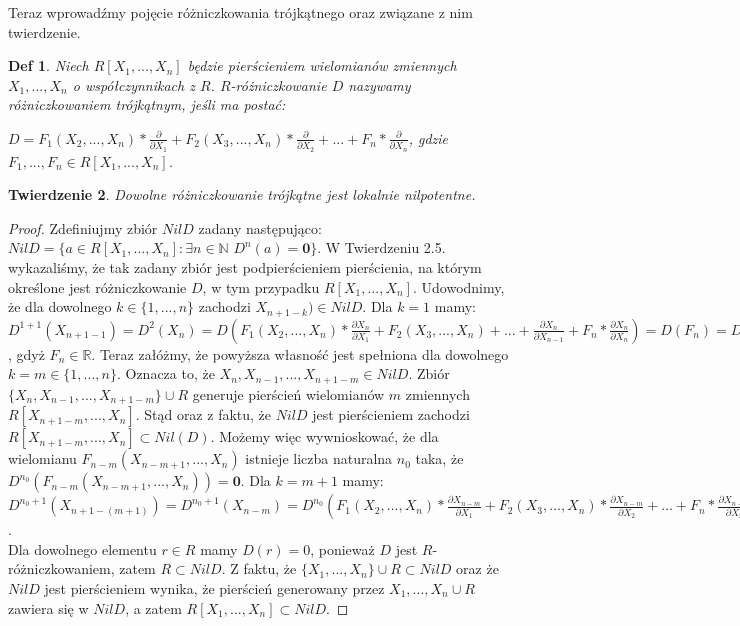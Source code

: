\documentclass[12pt,a4paper]{article}
\newtheorem{twr}{Twierdzenie}[section]
\newtheorem{definition}[twr]{Def}
\numberwithin{equation}{section}
\begin{document}
Teraz wprowadźmy pojęcie różniczkowania trójkątnego oraz związane z nim twierdzenie.

\begin{definition}
Niech $R[X_1,...,X_n]$ będzie pierścieniem wielomianów zmiennych $X_1,...,X_n$ o współczynnikach z $R$. $R$-różniczkowanie $D$ nazywamy różniczkowaniem trójkątnym, jeśli ma postać:
\begin{flushleft}
$D=F_1(X_2,...,X_n)*\frac{\partial}{\partial X_1}+F_2(X_3,...,X_n)*\frac{\partial}{\partial X_2}+...+F_n*\frac{\partial}{\partial X_n}$, gdzie $F_1,...,F_n \in R[X_1,...,X_n]$.
\end{flushleft}
\end{definition}

\begin{twr}
Dowolne różniczkowanie trójkątne jest lokalnie nilpotentne.
\end{twr}
\begin{proof}
Zdefiniujmy zbiór $NilD$ zadany następująco: $NilD=\{a\in R[X_1,...,X_n]: \exists n\in \mathbb{N}$ $D^n(a)=\textbf{0}\}$. W Twierdzeniu 2.5. wykazaliśmy, że tak zadany zbiór jest podpierścieniem pierścienia, na którym określone jest różniczkowanie $D$, w tym przypadku $R[X_1,...,X_n]$. 
Udowodnimy, że dla dowolnego $k\in \{ 1,...,n\}$ zachodzi $X_{n+1-k})\in NilD$. 
Dla $k=1$ mamy:
\\$D^{1+1}(X_{n+1-1})=D^2(X_n)=D(F_1(X_2,...,X_n)*\frac{\partial X_n}{\partial X_1}+F_2(X_3,...,X_n)+...+\frac{\partial X_n}{\partial X_{n-1}}+F_n*\frac{\partial X_n}{\partial X_n})=D(F_n)=D(F_1(X_2,...,X_n)*\frac{\partial F_n}{\partial X_1}+F_2(X_3,...,X_n)+...+F_n*\frac{\partial F_n}{\partial X_n})=\textbf{0}$, gdyż $F_n \in \mathbb{R}$.
Teraz załóżmy, że powyższa własność jest spełniona dla dowolnego $k=m\in \{1,...,n\}$. 
Oznacza to, że $X_n,X_{n-1},...,X_{n+1-m}\in NilD$. Zbiór $\{X_n,X_{n-1},...,X_{n+1-m}\}\cup R$ generuje pierścień wielomianów $m$ zmiennych $R[X_{n+1-m},...,X_n]$. Stąd oraz z faktu, że $NilD$ jest pierścieniem zachodzi $R[X_{n+1-m},...,X_n]\subset Nil(D)$.
Możemy więc wywnioskować, że dla wielomianu $F_{n-m}(X_{n-m+1},...,X_n)$ istnieje liczba naturalna $n_0$ taka, że $D^{n_0}(F_{n-m}(X_{n-m+1},...,X_n))=\textbf{0}$. 
Dla $k=m+1$ mamy:
\\$D^{n_0+1}(X_{n+1-(m+1)})=D^{n_0+1}(X_{n-m})=D^{n_0}(F_1(X_2,...,X_n)*\frac{\partial X_{n-m}}{\partial X_1}+F_2(X_3,...,X_n)*\frac{\partial X_{n-m}}{\partial X_2}+...+F_n*\frac{\partial X_{n-m}}{\partial X_n})=D^{n_0}(F_{n-m}(X_{n-m+1},...,X_n))
=\textbf{0}$.
\\Dla dowolnego elementu $r\in R$ mamy $D(r)=0$, ponieważ $D$ jest $R$-różniczkowaniem, zatem $R\subset NilD$.
Z faktu, że $\{X_1,...,X_n\}\cup R \subset NilD$ oraz że $NilD$ jest pierścieniem wynika, że pierścień generowany przez ${X_1,...,X_n}\cup R$ zawiera się w $NilD$, a zatem $R[X_1,...,X_n]\subset NilD$.
\end{proof}
\end{document}

